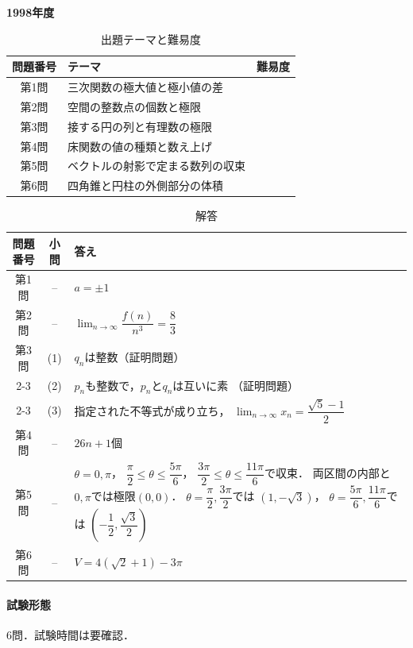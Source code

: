 \documentclass[../../main.tex]{subfiles}
\begin{document}
\begin{center}
  {\fontsize{48pt}{58pt}\selectfont \textbf{1998}\normalsize\textbf{年度}}
\end{center}

\begin{table}[htb]
  \centering
  \caption{出題テーマと難易度}
  \begin{tabular}{|c|p{9cm}|c|}
    \hline
    \textbf{問題番号} & \textbf{テーマ} & \textbf{難易度} \\
    \hline
    第1問 & 三次関数の極大値と極小値の差 & \\
    \hline
    第2問 & 空間の整数点の個数と極限 & \\
    \hline
    第3問 & 接する円の列と有理数の極限 & \\
    \hline
    第4問 & 床関数の値の種類と数え上げ & \\
    \hline
    第5問 & ベクトルの射影で定まる数列の収束 & \\
    \hline
    第6問 & 四角錐と円柱の外側部分の体積 & \\
    \hline
  \end{tabular}
\end{table}

\begin{table}[htb]
  \centering
  \caption{解答}
  \renewcommand{\arraystretch}{1.4}
  \begin{tabular}{|c|c|p{9cm}|}
    \hline
    \textbf{問題番号} & \textbf{小問} & \textbf{答え} \\
    \hline
    第1問 & -- & $a=\pm1$ \\
    \hline
    第2問 & -- & $\displaystyle\lim_{n\to\infty}
    \dfrac{f(n)}{n^3}=\dfrac{8}{3}$ \\
    \hline
    第3問 & (1) & $q_n$は整数（証明問題） \\
    \cline{2-3}
    & (2) & $p_n$も整数で，$p_n$と$q_n$は互いに素
    （証明問題） \\
    \cline{2-3}
    & (3) & 指定された不等式が成り立ち，
    $\displaystyle\lim_{n\to\infty}x_n
    =\dfrac{\sqrt{5}-1}{2}$ \\
    \hline
    第4問 & -- & $26n+1$個 \\
    \hline
    第5問 & -- & $\theta=0,\pi$，
    $\dfrac{\pi}{2}\le\theta\le\dfrac{5\pi}{6}$，
    $\dfrac{3\pi}{2}\le\theta\le\dfrac{11\pi}{6}$で収束．
    両区間の内部と$0,\pi$では極限$(0,0)$．
    $\theta=\dfrac{\pi}{2},\dfrac{3\pi}{2}$では
    $\left(1,-\sqrt{3}\right)$，
    $\theta=\dfrac{5\pi}{6},\dfrac{11\pi}{6}$では
    $\left(-\dfrac{1}{2},\dfrac{\sqrt{3}}{2}\right)$ \\
    \hline
    第6問 & -- & $V=4(\sqrt{2}+1)-3\pi$ \\
    \hline
  \end{tabular}
\end{table}

\paragraph{試験形態}
6問．試験時間は要確認．
\end{document}
